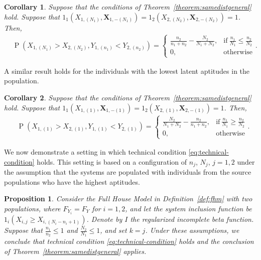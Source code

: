 \documentclass[12pt]{article}
\DeclareMathOperator*{\Prob}{P}
\newtheorem{corollary}{Corollary}[theorem]
\newtheorem{prop}[theorem]{Proposition}
\begin{document}
\begin{corollary} \label{corollary:samedisttop}
Suppose that the conditions of Theorem~\ref{theorem:samedistgeneral} hold. Suppose that $1_1(X_{1,(N_1)}, \textbf{X}_{1,-(N_1)}) = 1_2(X_{2,(N_2)}, \textbf{X}_{2,-(N_2)}) = 1$. Then,
\begin{align*}
	&\Prob\left(X_{1,(N_1)} > X_{2,(N_2)}, Y_{1,(n_1)} < Y_{2,(n_2)}\right) 
  = \begin{cases}
      \frac{n_2}{n_1 + n_2} - \frac{N_2}{N_1 + N_2}, & \text{if}\ \frac{n_1}{N_1} \leq \frac{n_2}{N_2} \\
      0, & \text{otherwise}
    \end{cases}.
\end{align*}
\end{corollary}

A similar result holds for the individuals with the lowest latent aptitudes in the population.

\begin{corollary} \label{corollary:samedistbottom}
Suppose that the conditions of Theorem~\ref{theorem:samedistgeneral} hold. Suppose that $1_1(X_{1,(1)}, \textbf{X}_{1,-(1)}) = 1_2(X_{2,(1)}, \textbf{X}_{2,-(1)}) = 1$. Then,
\begin{align*}
	&\Prob\left(X_{1,(1)} > X_{2,(1)}, Y_{1,(1)} < Y_{2,(1)}\right) 
  = \begin{cases}
      \frac{N_2}{N_1 + N_2} - \frac{n_2}{n_1 + n_2}, & \text{if}\ \frac{n_1}{N_1} \geq \frac{n_2}{N_2} \\
      0, & \text{otherwise}
    \end{cases}.
\end{align*}
\end{corollary}


We now demonstrate a setting in which technical condition \eqref{eq:technical-condition} holds. This setting is based on a configuration of $n_j$, $N_j$, $j=1,2$ under the assumption that the systems are populated with individuals from the source populations who have the highest aptitudes.


\begin{prop} \label{prop:condition}
Consider the Full House Model in Definition~\ref{def:fhm} with two populations, where $F_{Y_i} = F_{Y}$ for $i=1,2$, and let the system inclusion function be $1_i(X_{i,j} \geq X_{i,(N_i - n_i + 1)})$. Denote by $I$ the regularized incomplete beta function. Suppose that $\frac{n_1}{n_2}\leq 1$ and $\frac{N_2}{N_1} \leq 1$, and set $k = j$. Under these assumptions, we conclude that technical condition \eqref{eq:technical-condition} holds and the conclusion of Theorem~\ref{theorem:samedistgeneral} applies.	
\end{prop}
\end{document}
